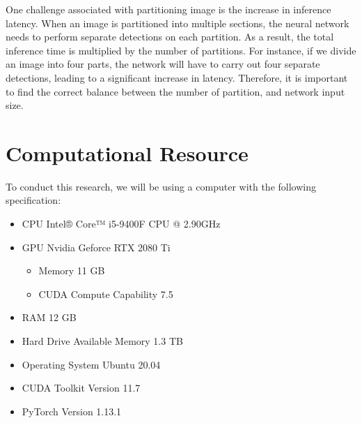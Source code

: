   One challenge associated with partitioning image is the increase in inference latency.
  When an image is partitioned into multiple sections, the neural network needs to perform separate detections on each partition.
  As a result, the total inference time is multiplied by the number of partitions.
  For instance, if we divide an image into four parts, the network will have to carry out four separate detections, leading to a significant increase in latency. 
  Therefore, it is important to find the correct balance between the number of partition, and network input size.
    
\section{Computational Resource}
\label{section:instrument}
To conduct this research, we will be using a computer with the following specification:
\begin{itemize}[itemsep=1pt,leftmargin=.1\textwidth,rightmargin=.1\textwidth]
  \item CPU \hfill Intel® Core™ i5-9400F CPU @ 2.90GHz
  \item GPU \hfill Nvidia Geforce RTX 2080 Ti
  \begin{itemize}[noitemsep,topsep=0pt]
    \item[] Memory \hfill 11 GB
    \item[] CUDA Compute Capability \hfill 7.5
  \end{itemize}
  \item RAM \hfill 12 GB
  \item Hard Drive Available Memory \hfill 1.3 TB
  \item Operating System \hfill Ubuntu 20.04
  \item CUDA Toolkit Version \hfill 11.7
  \item PyTorch Version \hfill 1.13.1
\end{itemize}

